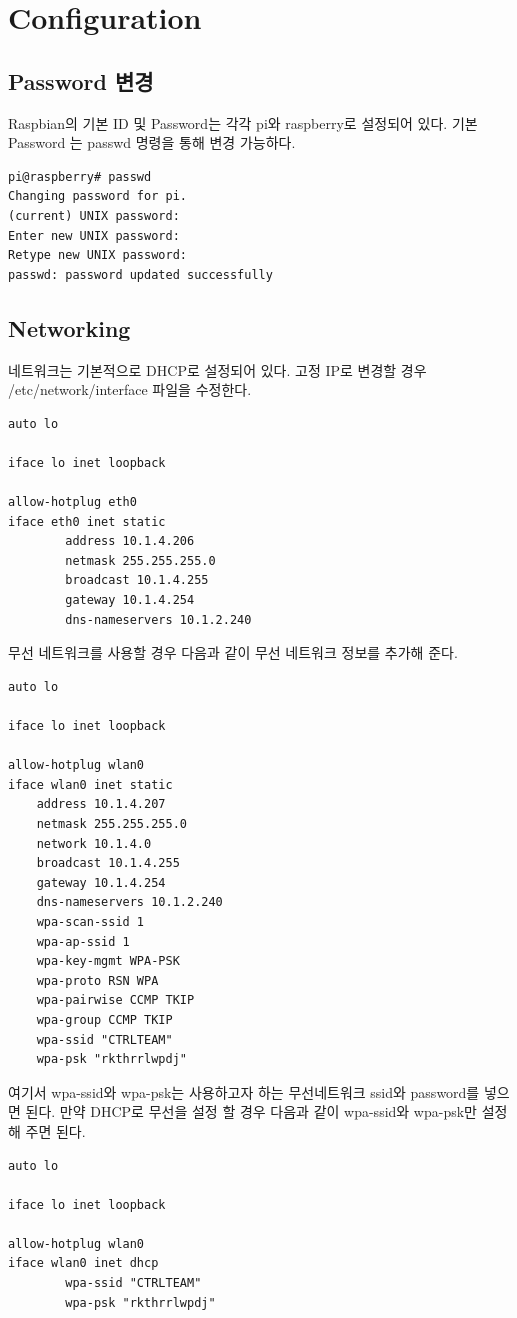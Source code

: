 \documentclass[11pt
  , a4paper
  , article
  , oneside
]{memoir}
\begin{document}
\section{Configuration}
\subsection{Password 변경}
Raspbian의 기본 ID 및 Password는 각각 pi와 raspberry로 설정되어 있다. 기본 Password 는 passwd
명령을 통해 변경 가능하다.
\begin{lstlisting}[style=termstyle]
pi@raspberry# passwd
Changing password for pi.
(current) UNIX password: 
Enter new UNIX password: 
Retype new UNIX password: 
passwd: password updated successfully
\end{lstlisting}

\subsection{Networking}
네트워크는 기본적으로 DHCP로 설정되어 있다. 고정 IP로 변경할 경우 /etc/network/interface 파일을 수정한다.
\begin{lstlisting}[style=termstyle]
auto lo

iface lo inet loopback

allow-hotplug eth0
iface eth0 inet static
        address 10.1.4.206
        netmask 255.255.255.0
        broadcast 10.1.4.255
        gateway 10.1.4.254
        dns-nameservers 10.1.2.240
\end{lstlisting}
무선 네트워크를 사용할 경우 다음과 같이 무선 네트워크 정보를 추가해 준다.
\begin{lstlisting}[style=termstyle]
auto lo

iface lo inet loopback

allow-hotplug wlan0
iface wlan0 inet static
	address 10.1.4.207
	netmask 255.255.255.0
	network 10.1.4.0
	broadcast 10.1.4.255
	gateway 10.1.4.254
	dns-nameservers 10.1.2.240
	wpa-scan-ssid 1
	wpa-ap-ssid 1
	wpa-key-mgmt WPA-PSK
	wpa-proto RSN WPA
	wpa-pairwise CCMP TKIP
	wpa-group CCMP TKIP
	wpa-ssid "CTRLTEAM"
	wpa-psk "rkthrrlwpdj"
\end{lstlisting}
여기서 wpa-ssid와 wpa-psk는 사용하고자 하는 무선네트워크 ssid와 password를 넣으면 된다. 만약 DHCP로
무선을 설정 할 경우 다음과 같이 wpa-ssid와 wpa-psk만 설정해 주면 된다.
\begin{lstlisting}[style=termstyle]
auto lo

iface lo inet loopback

allow-hotplug wlan0
iface wlan0 inet dhcp
        wpa-ssid "CTRLTEAM"
        wpa-psk "rkthrrlwpdj"
\end{lstlisting}
\end{document}
